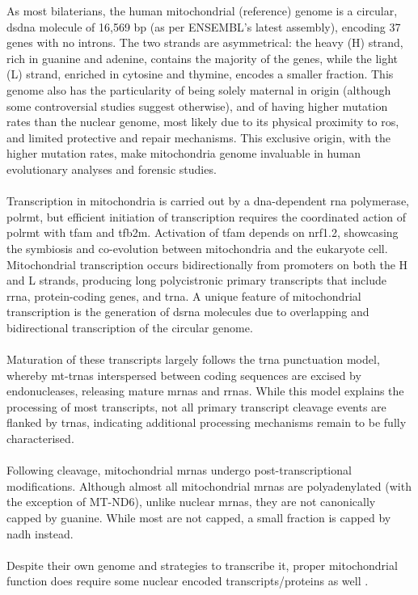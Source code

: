 As most bilaterians, the human mitochondrial (reference) genome is a circular, \gls{dsdna} molecule of 16,569 \gls{bp} (as per ENSEMBL's latest assembly\cite{frankish_gencode_2021}), encoding 37 genes with no introns\cite{habbane_human_2021}. The two strands are asymmetrical: the heavy (H) strand, rich in guanine and adenine, contains the majority of the genes, while the light (L) strand, enriched in cytosine and thymine, encodes a smaller fraction\cite{habbane_human_2021}. This genome also has the particularity of being solely maternal in origin (although some controversial studies suggest otherwise\cite{wei_inheritance_2020}), and of having higher mutation rates than the nuclear genome, most likely due to its physical proximity to \gls{ros}, and limited protective and repair mechanisms\cite{lawless_rise_2020}. This exclusive origin, with the higher mutation rates, make mitochondria genome invaluable in human evolutionary analyses\cite{desalle_mtdna_2017} and forensic studies\cite{gill_identification_1994}.
\\
\\
Transcription in mitochondria is carried out by a \gls{dna}-dependent \gls{rna} polymerase, \gls{polrmt}, but efficient initiation of transcription requires the coordinated action of \gls{polrmt} with \gls{tfam} and \gls{tfb2m}\cite{dsouza_mitochondrial_2018}. Activation of \gls{tfam} depends on \gls{nrf1.2}, showcasing the symbiosis and co-evolution between mitochondria and the eukaryote cell\cite{casanova_mitochondria_2023}. Mitochondrial transcription occurs bidirectionally from promoters on both the H and L strands, producing long polycistronic primary transcripts that include \gls{rrna}, protein-coding genes, and \gls{trna}\cite{dsouza_mitochondrial_2018}. A unique feature of mitochondrial transcription is the generation of \gls{dsrna} molecules due to overlapping and bidirectional transcription of the circular genome\cite{lopez-polo_release_2024}.
\\
\\
Maturation of these transcripts largely follows the \gls{trna} punctuation model, whereby mt-\glspl{trna} interspersed between coding sequences are excised by endonucleases, releasing mature \glspl{mrna} and \glspl{rrna}\cite{dsouza_mitochondrial_2018}. While this model explains the processing of most transcripts, not all primary transcript cleavage events are flanked by \glspl{trna}, indicating additional processing mechanisms remain to be fully characterised\cite{dsouza_mitochondrial_2018}.
\\
\\
Following cleavage, mitochondrial \glspl{mrna} undergo post-transcriptional modifications. Although almost all mitochondrial \glspl{mrna} are polyadenylated (with the exception of MT-ND6), unlike nuclear \glspl{mrna}, they are not canonically capped by guanine\cite{bird_highly_2018}. While most are not capped, a small fraction is capped by \gls{nadh} instead\cite{bird_highly_2018}.
\\
\\
Despite their own genome and strategies to transcribe it, proper mitochondrial function does require some nuclear encoded transcripts/proteins as well \cite{harrington_mitochondria_2023, casanova_mitochondria_2023}.

